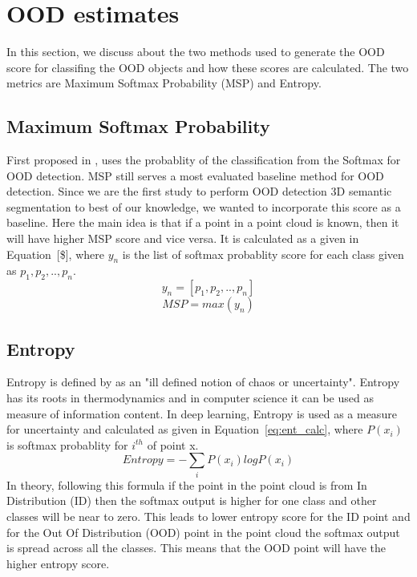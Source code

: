 \section{OOD estimates}
In this section, we discuss about the two methods used to generate the OOD score for classifing the OOD objects and how these scores are calculated.
The two metrics are Maximum Softmax Probability (MSP) and Entropy.
\subsection{Maximum Softmax Probability}
First proposed in \cite{hendrycks2016baseline_MSP}, uses the probablity of the classification from the Softmax for OOD detection. 
MSP still serves a most evaluated baseline method for OOD detection.
Since we are the first study to perform OOD detection 3D semantic segmentation to best of our knowledge, we wanted to incorporate this score as a baseline. 
Here the main idea is that if a point in a point cloud is known, then it will have higher MSP score and vice versa.
It is calculated as a given in Equation~[\$], where $y_n$ is the list of softmax probablity score for each class given as $p_1, p_2, .., p_n$.
$$y_n = [p_1, p_2,..,p_n]$$
\begin{equation}
    MSP = max(y_n)
\end{equation}

\subsection{Entropy}
Entropy is defined by \cite{entropy_robinson} as an "ill defined notion of chaos or uncertainty".
Entropy has its roots in thermodynamics and in computer science it can be used as measure of information content.
In deep learning, Entropy is used as a measure for uncertainty and calculated as given in Equation~\ref{eq:ent_calc}, where $P(x_i)$ is softmax probablity for $i^{th}$ of point x.
\begin{equation}
    Entropy = -\sum_i P(x_i) log P(x_i)
    \label{eq:ent_calc}
\end{equation}
In theory, following this formula if the point in the point cloud is from In Distribution (ID) then the softmax output is higher for one class and other classes will be near to zero.
This leads to lower entropy score for the ID point and for the Out Of Distribution (OOD) point in the point cloud the softmax output is spread across all the classes.
This means that the OOD point will have the higher entropy score.


